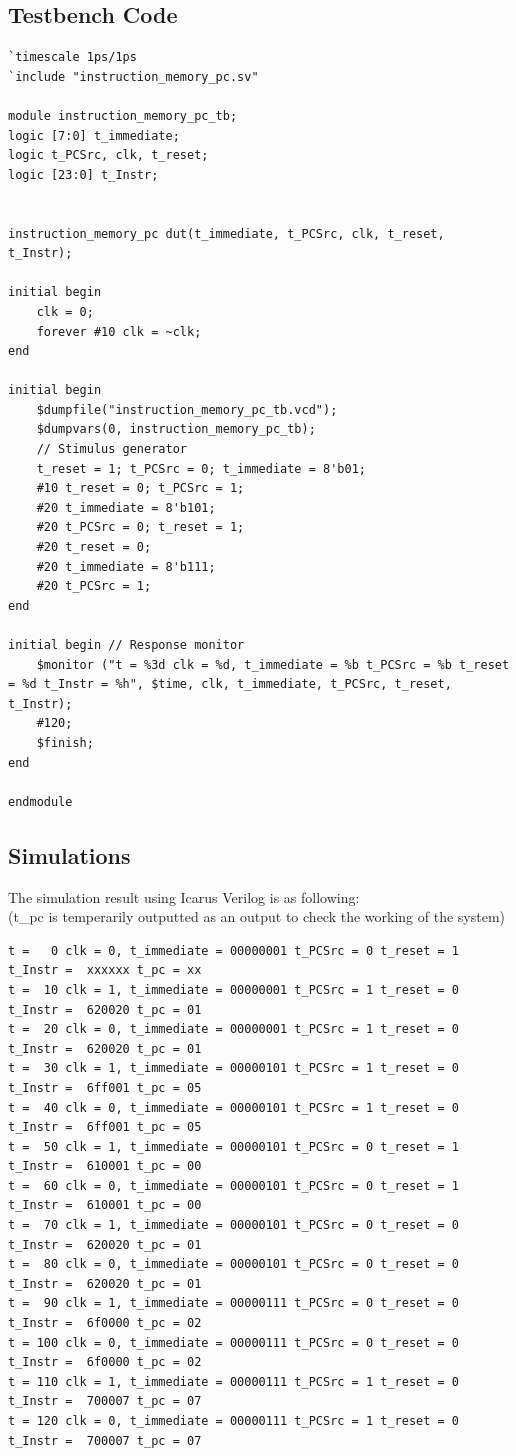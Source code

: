 \documentclass{article}
\begin{document}
\subsection{Testbench Code}
\begin{lstlisting}
`timescale 1ps/1ps
`include "instruction_memory_pc.sv"

module instruction_memory_pc_tb;
logic [7:0] t_immediate;
logic t_PCSrc, clk, t_reset;
logic [23:0] t_Instr;


instruction_memory_pc dut(t_immediate, t_PCSrc, clk, t_reset, t_Instr);

initial begin
    clk = 0;
    forever #10 clk = ~clk;
end

initial begin
    $dumpfile("instruction_memory_pc_tb.vcd"); 
    $dumpvars(0, instruction_memory_pc_tb);
    // Stimulus generator
    t_reset = 1; t_PCSrc = 0; t_immediate = 8'b01;
    #10 t_reset = 0; t_PCSrc = 1;
    #20 t_immediate = 8'b101;
    #20 t_PCSrc = 0; t_reset = 1;
    #20 t_reset = 0;
    #20 t_immediate = 8'b111;
    #20 t_PCSrc = 1;
end

initial begin // Response monitor
    $monitor ("t = %3d clk = %d, t_immediate = %b t_PCSrc = %b t_reset = %d t_Instr = %h", $time, clk, t_immediate, t_PCSrc, t_reset, t_Instr);
    #120;
    $finish; 
end

endmodule
\end{lstlisting}

\subsection{Simulations}
The simulation result using Icarus Verilog is as following: \\
(t\_pc is temperarily outputted as an output to check the working of the system)
\begin{Verbatim}
t =   0 clk = 0, t_immediate = 00000001 t_PCSrc = 0 t_reset = 1 t_Instr =  xxxxxx t_pc = xx
t =  10 clk = 1, t_immediate = 00000001 t_PCSrc = 1 t_reset = 0 t_Instr =  620020 t_pc = 01
t =  20 clk = 0, t_immediate = 00000001 t_PCSrc = 1 t_reset = 0 t_Instr =  620020 t_pc = 01
t =  30 clk = 1, t_immediate = 00000101 t_PCSrc = 1 t_reset = 0 t_Instr =  6ff001 t_pc = 05
t =  40 clk = 0, t_immediate = 00000101 t_PCSrc = 1 t_reset = 0 t_Instr =  6ff001 t_pc = 05
t =  50 clk = 1, t_immediate = 00000101 t_PCSrc = 0 t_reset = 1 t_Instr =  610001 t_pc = 00
t =  60 clk = 0, t_immediate = 00000101 t_PCSrc = 0 t_reset = 1 t_Instr =  610001 t_pc = 00
t =  70 clk = 1, t_immediate = 00000101 t_PCSrc = 0 t_reset = 0 t_Instr =  620020 t_pc = 01
t =  80 clk = 0, t_immediate = 00000101 t_PCSrc = 0 t_reset = 0 t_Instr =  620020 t_pc = 01
t =  90 clk = 1, t_immediate = 00000111 t_PCSrc = 0 t_reset = 0 t_Instr =  6f0000 t_pc = 02
t = 100 clk = 0, t_immediate = 00000111 t_PCSrc = 0 t_reset = 0 t_Instr =  6f0000 t_pc = 02
t = 110 clk = 1, t_immediate = 00000111 t_PCSrc = 1 t_reset = 0 t_Instr =  700007 t_pc = 07
t = 120 clk = 0, t_immediate = 00000111 t_PCSrc = 1 t_reset = 0 t_Instr =  700007 t_pc = 07
\end{Verbatim}
\end{document}
